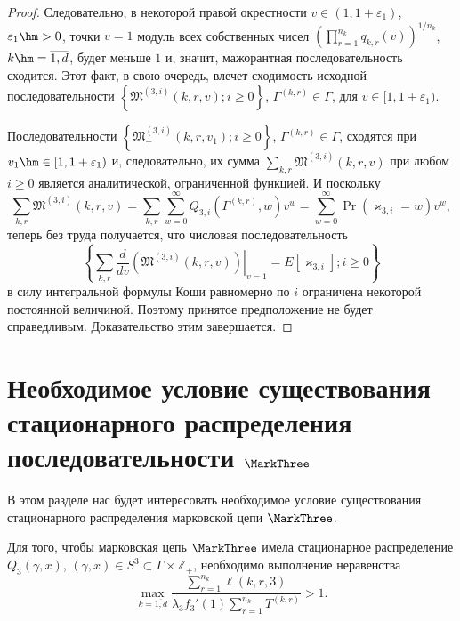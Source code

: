 \begin{proof}
Следовательно,  в некоторой правой окрестности $v \in (1,  1 + \varepsilon_1)$,  $\varepsilon_1 \hm> 0$,  точки $v=1$ модуль всех собственных чисел $\left(\prod_{r=1}^{n_k}q_{k, r} (v)\right)^{1/n_k}$,  $k\hm=\overline{1, d}$,  будет меньше $1$ и,  значит,  мажорантная последовательность сходится. Этот факт,  в свою очередь,  влечет сходимость исходной последовательности $\left\{\mathfrak{M}^{(3, i)}(k, r, v); i \geqslant 0\right\}$,  $\Gamma^{(k, r)} \in \Gamma$,  для $v \in [1,  1 + \varepsilon_1)$.

Последовательности $\left\{\mathfrak{M}_+^{(3, i)}(k, r, v_1); i \geqslant 0\right\}$,  $\Gamma^{(k, r)} \in \Gamma$,  сходятся при $v_1 \hm\in [1, 1+\varepsilon_1)$ и,  следовательно,  их сумма 
$\sum_{k, r} \mathfrak{M}^{(3, i)}(k, r, v)$ при любом $i\geqslant 0$ является аналитической,  ограниченной  функцией.
И поскольку
\begin{equation}
\sum_{k, r} \mathfrak{M}^{(3, i)}(k, r, v) = \sum_{k, r} \sum_{w=0}^{\infty} Q_{3, i}(\Gamma^{(k, r)}, w) v^w = 
 \sum_{w=0}^{\infty} \Pr(\varkappa_{3, i}=w) v^w, 
\end{equation}
теперь без труда получается,  что числовая последовательность 
$$
\left\{\sum_{k, r} \frac{d}{dv}\left(\left.\mathfrak{M}^{(3, i)}(k, r, v)\right)\right|_{v=1}= E[\varkappa_{3, i}]; i\geqslant 0\right\} 
$$
в силу интегральной формулы Коши равномерно по $i$ ограничена некоторой постоянной величиной. Поэтому принятое предположение не будет справедливым. Доказательство этим завершается.
\end{proof}








\section[Необходимое условие существования стационарного {распределения} последовательности ${\MarkThree}$]%
{Необходимое условие существования стационарного {распределения} последовательности $\boldsymbol{\MarkThree}$}
В этом разделе нас будет интересовать необходимое условие существования стационарного распределения марковской цепи $\MarkThree$.
\begin{theorem}
Для того,  чтобы марковская цепь $\MarkThree$ имела стационарное распределение $Q_3(\gamma, x)$,  $(\gamma, x)\in S^{3} \subset \Gamma \times {\mathbb Z}_+$,  необходимо выполнение неравенства
$$
\max_{k=\overline{1, d}} { \frac{\sum_{r = 1}^{n_{k}}\ell(k, r, 3)}{\lambda_3 f_3'(1) \sum_{r = 1}^{n_k} T^{(k, r)}} } >1.
$$
\end{theorem}

